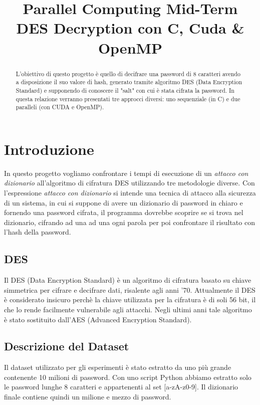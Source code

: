 \documentclass[10pt,twocolumn,letterpaper]{article}
\begin{document}
\title{Parallel Computing Mid-Term\\DES Decryption con C, Cuda \& OpenMP}

\maketitle
\thispagestyle{empty}

\begin{abstract}
   L'obiettivo di questo progetto è quello di decifrare una password di 8 caratteri avendo a disposizione il suo valore di hash, generato tramite algoritmo DES (Data Encryption Standard) e supponendo di conoscere il "salt" con cui è stata cifrata la password. In questa relazione verranno presentati tre approcci diversi: uno sequenziale (in C) e due paralleli (con CUDA e OpenMP).
\end{abstract}

\section{Introduzione}
In questo progetto vogliamo confrontare i tempi di esecuzione di un \textit{attacco con dizionario} all'algoritmo di cifratura DES utilizzando tre metodologie diverse. Con l'espressione \textit{attacco con dizionario} si intende una tecnica di attacco alla sicurezza di un sistema, in cui si suppone di avere un dizionario di password in chiaro e fornendo una password cifrata, il programma dovrebbe scoprire se si trova nel dizionario, cifrando ad una ad una ogni parola per poi confrontare il risultato con l'hash della password.

\subsection{DES}
Il DES (Data Encryption Standard) è un algoritmo di cifratura basato su chiave simmetrica per cifrare e decifrare dati, risalente agli anni '70. Attualmente il DES è considerato insicuro perchè la chiave utilizzata per la cifratura è di soli 56 bit, il che lo rende facilmente vulnerabile agli attacchi. Negli ultimi anni tale algoritmo è stato sostituito dall'AES (Advanced Encryption Standard).\cite{DES} 

\subsection{Descrizione del Dataset}
Il dataset utilizzato per gli esperimenti è stato estratto da uno più grande contenente 10 milioni di password\cite{DATASET}. Con uno script Python abbiamo estratto solo le password lunghe 8 caratteri e appartenenti al set [a-zA-z0-9]. Il dizionario finale contiene quindi un milione e mezzo di password.
\end{document}
